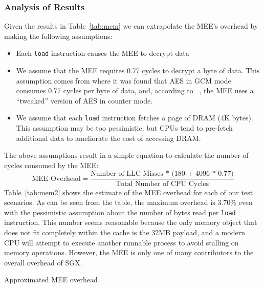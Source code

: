 \documentclass[../../../main.tex]{subfiles}
\begin{document}
\subsubsection*{Analysis of Results}
Given the results in Table~\ref{tab:mem} we can extrapolate the MEE's
overhead by making the following assumptions:
\begin{itemize}
  \item Each \texttt{load} instruction causes the MEE to decrypt data
  \item We assume that the MEE requires 0.77 cycles to decrypt a byte of data.
    This assumption comes from \cite{cyclesaes} where it was found that
    AES in GCM mode consumes 0.77 cycles per byte of data, and, according to
    ~\Intel, the MEE uses a ``tweaked'' version of AES in counter mode.
  \item We assume that each \texttt{load} instruction fetches a page
    of DRAM (4K bytes). This assumption may be too pessimistic, but CPUs
    tend to pre-fetch additional data to ameliorate the cost of accessing
    DRAM.
\end{itemize}
The above assumptions result in a simple equation to calculate the number
of cycles consumed by the MEE:
\begin{equation*}
  \text{MEE Overhead} = \frac{\text{Number of LLC Misses
    * (180 + 4096 * 0.77)}}{\text{Total Number of CPU Cycles}}
\end{equation*}
Table~\ref{tab:mem2} shows the estimate of the MEE overhead for each
of our test scenarios. As can be seen from the table, the maximum
overhead is 3.70\% even with the pessimistic assumption about the
number of bytes read per \texttt{load} instruction. This number seems
reasonable because the only memory object that does not fit completely
within the cache is the 32MB payload, and a modern CPU will attempt to
execute another runnable process to avoid stalling on memory
operations. However, the MEE is only one of many contributors to the
overall overhead of SGX.

\begin{table}[H]
  \caption{Approximated MEE overhead}
  \label{tab:mem2}
\end{table}
\end{document}

